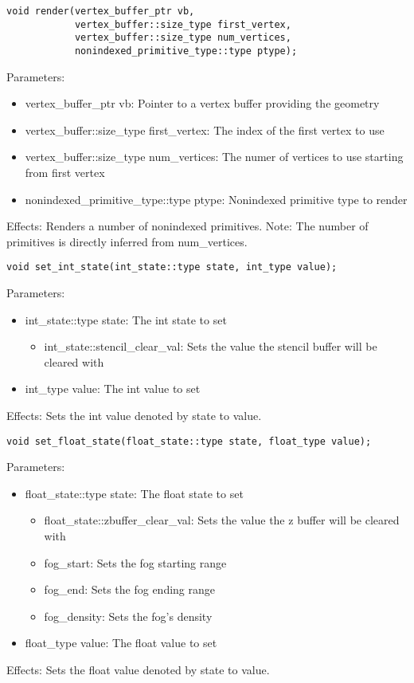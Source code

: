 \documentclass{article}
\begin{document}
\begin{lstlisting}
void render(vertex_buffer_ptr vb,
            vertex_buffer::size_type first_vertex,
            vertex_buffer::size_type num_vertices,
            nonindexed_primitive_type::type ptype);
\end{lstlisting}
Parameters:
\begin{itemize}
\item vertex\_buffer\_ptr vb: Pointer to a vertex buffer providing the geometry
\item vertex\_buffer::size\_type first\_vertex: The index of the first vertex to use
\item vertex\_buffer::size\_type num\_vertices: The numer of vertices to use starting from first vertex
\item nonindexed\_primitive\_type::type ptype: Nonindexed primitive type to render
\end{itemize}
Effects: Renders a number of nonindexed primitives.
Note: The number of primitives is directly inferred from num\_vertices.

\begin{lstlisting}
void set_int_state(int_state::type state, int_type value);
\end{lstlisting}
Parameters:
\begin{itemize}
\item int\_state::type state: The int state to set
  \begin{itemize}
  \item int\_state::stencil\_clear\_val: Sets the value the stencil buffer will be cleared with
  \end{itemize}
\item int\_type value: The int value to set
\end{itemize}
Effects: Sets the int value denoted by state to value.

\begin{lstlisting}
void set_float_state(float_state::type state, float_type value);
\end{lstlisting}
Parameters:
\begin{itemize}
\item float\_state::type state: The float state to set
  \begin{itemize}
  \item float\_state::zbuffer\_clear\_val: Sets the value the z buffer will be cleared with
  \item fog\_start: Sets the fog starting range
  \item fog\_end: Sets the fog ending range
  \item fog\_density: Sets the fog's density
  \end{itemize}
\item float\_type value: The float value to set
\end{itemize}
Effects: Sets the float value denoted by state to value.
\end{document}
